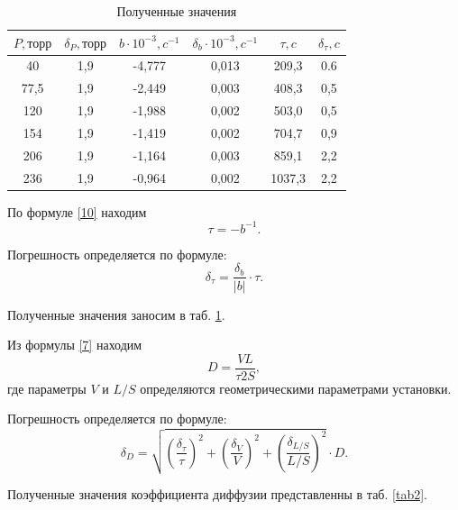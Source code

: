\documentclass[a4paper, 12pt]{article}
\begin{document}
\begin{table}[h!]
\renewcommand{\arraystretch}{1.5}
\begin{center}
\begin{tabular}{|c|c|c|c|c|c|}
\hline 
$P, торр$ & $\delta_{P}, торр$ & $b\cdot10^{-3}, c^{-1}$ & $\delta_{b}\cdot10^{-3}, c^{-1}$ & $\tau, c$ & $\delta_{\tau}, c$\\ 
\hline 
40 & 1,9 & -4,777 & 0,013 & 209,3 & 0.6\\ 
\hline 
77,5 & 1,9 & -2,449 & 0,003 & 408,3 & 0,5\\ 
\hline 
120 & 1,9 & -1,988 & 0,002 & 503,0 & 0,5\\ 
\hline 
154 & 1,9 & -1,419 & 0,002 & 704,7 & 0,9\\ 
\hline 
206 & 1,9 & -1,164 & 0,003 & 859,1 & 2,2\\ 
\hline 
236 & 1,9 & -0,964 & 0,002 & 1037,3 & 2,2\\ 
\hline 
\end{tabular}
\caption{Полученные значения}
\label{tab1}
\end{center}
\end{table}

По формуле \eqref{10} находим
\begin{equation}\label{tau}
\tau = -b^{-1}.
\end{equation}

Погрешность определяется по формуле:
\begin{equation}\label{dtau}
\delta_{\tau} = \frac{\delta_{b}}{\vert b \vert} \cdot \tau.
\end{equation}

Полученные значения заносим в таб. \ref{tab1}.

Из формулы \eqref{7} находим
\begin{equation}\label{dif}
D = \frac{VL}{\tau 2S},
\end{equation}
где параметры $V$ и $L/S$ определяются геометрическими параметрами установки.

Погрешность определяется по формуле:
\begin{equation}\label{ddif}
\delta_D = \sqrt{\left(\frac{\delta_{\tau}}{\tau}\right)^2 + \left(\frac{\delta_{V}}{V}\right)^2 + \left(\frac{\delta_{L/S}}{L/S}\right)^2} \cdot D.
\end{equation}

Полученные значения коэффициента диффузии представленны в таб. \ref{tab2}.
\end{document}
